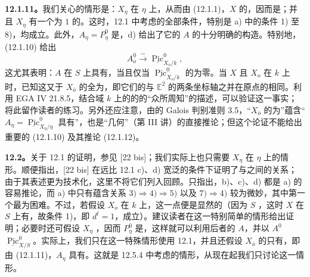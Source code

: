 \textbf{12.1.11。}我们关心的情形是：$X_\eta$ 在 $\eta$ 上，从而由 (12.1.1)，$X$ 的，因而是；并且 $X_\eta$ 有一个为 $1$ 的。这时，12.1 中考虑的全部条件，特别是 a) 中的条件 1) 至 8)，均成立。此外，$A_\eta=P_\eta^0$ 是，d) 给出了它的 $A$ 的十分明确的构造。特别地，(12.1.10) 给出
\[
 A_o^0\xrightarrow\sim\underline{\operatorname{Pic}}_{X_o/k}^0,\tag{12.1.12}
\]
这尤其表明：$A$ 在 $S$ 上具有，当且仅当 $\underline{\operatorname{Pic}}_{X_o/k}^0$ 的为零。当 $X$ 且 $X_o$ 在 $k$ 上时，已知这又于 $X_{\bar o}$ 的全为，即它们的与 $\mathbb E^2$ 的两条坐标轴之并在原点的相同。利用 EGA IV 21.8.5，结合域 $k$ 上的的的“众所周知”的描述，可以验证这一事实；将此留作读者的练习。另外还应注意，由的 Galois 判别准则 3.5，“$X_{\bar o}$ 的为”蕴含“$A_\eta=\underline{\operatorname{Pic}}_{X_\eta/\eta}^0$ 具有”，也是“几何”（第 III 讲）的直接推论；但这个论证不能给出重要的 (12.1.10) 及其推论 (12.1.12)。

\textbf{12.2。}关于 12.1 的证明，参见 [22 bis]；我们实际上也只需要 $X_\eta$ 在 $\eta$ 上的情形。顺便指出，[22 bis] 在远比 12.1 c)、d) 宽泛的条件下证明了与之间的关系；由于其表述更为技术化，这里不将它们列入回顾。只指出，b)、c)、d) 都是 a) 的容易推论，而 a) 中只有蕴含关系 $3)\Rightarrow4)\Rightarrow5)$ 以及 $7)\Rightarrow4)$ 较为微妙，其中第一个最为困难。不过，若假设 $X_o$ 在 $k$ 上，这一点便是显然的（因为 $S$ ，这时 $X$ 在 $S$ 上有，故条件 1)，即 $d^t=1$，成立）。建议读者在这一特别简单的情形给出证明；必要时还可假设 $X_\eta$ ，因而 $P_\eta^0$ 是，这样就可以利用后者的 $A$，并以 $A^0$  $\underline{\operatorname{Pic}}_{X/S}^0$。实际上，我们只在这一特殊情形使用 12.1，并且还假设 $X_{\bar o}$ 的只有，即由 (12.1.11)，$A_\eta$ 具有。这就是 12.5.4 中考虑的情形，从现在起我们只讨论这一情形。

